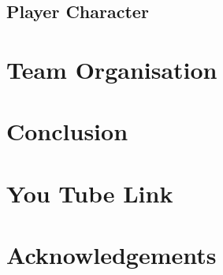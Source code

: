 \documentclass[11pt]{article}
\begin{document}
\subsection{Player Character}
\section{Team Organisation}

\section{Conclusion}

\section{You Tube Link}

\section{Acknowledgements}
\end{document}

